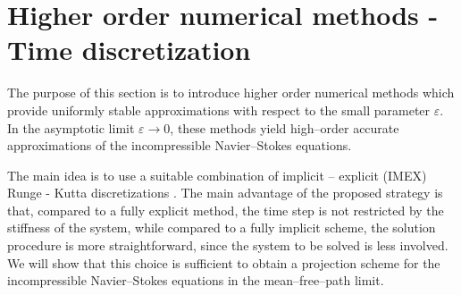 \documentclass[final,11pt]{siamart251216}
\numberwithin{equation}{section}
\theoremstyle{definition}
\theoremstyle{remark}
\begin{document}
\section{Higher order numerical methods - Time discretization}\label{sec3}
The purpose of this section is to introduce higher order  numerical methods which provide uniformly stable approximations with respect to the small parameter $\varepsilon$. In the asymptotic limit 
$\varepsilon\to 0$, these methods yield high–order accurate approximations of the incompressible Navier–Stokes equations.

The main idea is to use a suitable combination of implicit – explicit (IMEX) Runge - Kutta discretizations \cite{IMEX_PR,Bosc1}. The main advantage of the proposed strategy is that, compared to a fully explicit method, the time step is not restricted by the stiffness of the system, while compared to a fully implicit scheme, the solution procedure is more straightforward, since the system to be solved is less involved. We will show that this choice is sufficient to obtain a projection scheme for the incompressible Navier–Stokes equations in the mean–free–path limit. 
\end{document}
